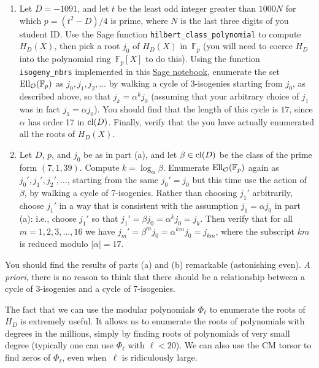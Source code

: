 \documentclass[11pt]{article}
\newcommand{\Fp}{\mathbb{F}_p}
\renewcommand{\O}{\mathcal{O}}
\newcommand{\EllO}{{\rm Ell}_\O}
\newcommand{\cl}{{\rm cl}}
\begin{document}
\begin{enumerate}[{\bf(a)}]
\item
Let $D=-1091$, and let $t$ be the least odd integer greater than $1000N$ for which $p=(t^2-D)/4$ is prime, where $N$ is the last three digits of you student ID.
Use the Sage function \texttt{hilbert\_class\_polynomial} to compute $H_D(X)$, then pick a root $j_0$ of $H_D(X)$ in~$\Fp$ (you will need to coerce $H_D$ into the polynomial ring~$\Fp[X]$ to do this).
Using the function \texttt{isogeny\_nbrs} implemented in this \href{https://cocalc.com/share/public_paths/e2a45f293be2d00354622ee999c2dc3801c0caba}{Sage notebook}, enumerate the set $\EllO(\Fp)$ as $j_0,j_1,j_2,\ldots $ by walking a cycle of 3-isogenies starting from $j_0$, as described above, so that $j_k=\alpha^k j_0$ (assuming that your arbitrary choice of $j_1$ was in fact $j_1=\alpha j_0$).  You should find that the length of this cycle is $17$, since $\alpha$ has order 17 in $\cl(D)$.  Finally, verify that the you have actually enumerated all the roots of $H_D(X)$.

\item
Let $D$, $p$, and $j_0$ be as in part (a), and let $\beta\in\cl(D)$ be the class of the prime form $(7,1,39)$.  Compute $k=\log_\alpha\beta$. Enumerate $\EllO(\Fp)$ again as $j_0',j_1',j_2',\ldots$, starting from the same $j_0'=j_0$ but this time use the action of $\beta$, by walking a cycle of 7-isogenies.  Rather than choosing $j_1'$ arbitrarily, choose $j_1'$ in a way that is consistent with the assumption $j_1=\alpha j_0$ in part (a): i.e., choose $j_1'$ so that $j_1'=\beta j_0=\alpha^k j_0 = j_k$.  Then verify that for all $m=1,2,3,\ldots,16$ we have $j_m'=\beta^m j_0 = \alpha^{km} j_0 = j_{km}$, where the subscript $km$ is reduced modulo $|\alpha|=17$.
\end{enumerate}

You should find the results of parts (a) and (b) remarkable (astonishing even).
\emph{A priori}, there is no reason to think that there should be a relationship between a cycle of 3-isogenies and a cycle of 7-isogenies.

The fact that we can use the modular polynomials $\Phi_\ell$ to enumerate the roots of $H_D$ is extremely useful.
It allows us to enumerate the roots of polynomials with degrees in the millions, simply by finding roots of polynomials of very small degree (typically one can use $\Phi_\ell$ with $\ell < 20$).
We can also use the CM torsor to find zeros of $\Phi_\ell$, even when~$\ell$ is ridiculously large.
\end{document}
